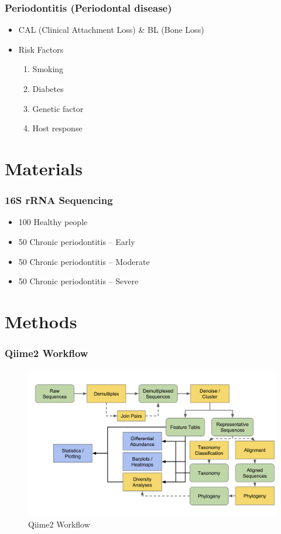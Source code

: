 \documentclass{beamer}
\begin{document}
    \begin{frame}
        \frametitle{Periodontitis (Periodontal disease)}

        \begin{itemize}
            \item CAL (Clinical Attachment Loss) \& BL (Bone Loss) \cite{periodontitis1}
            \item Risk Factors \cite{periodontitis2}
            \begin{enumerate}
                \item Smoking
                \item Diabetes
                \item Genetic factor
                \item Host response
            \end{enumerate}
        \end{itemize}
    \end{frame}

    \section{Materials}
    \begin{frame}
        \frametitle{16S rRNA Sequencing}

        \begin{itemize}
            \item 100 Healthy people
            \item 50 Chronic periodontitis -- Early
            \item 50 Chronic periodontitis -- Moderate
            \item 50 Chronic periodontitis -- Severe
        \end{itemize}
    \end{frame}

    \section{Methods}
    \begin{frame}
        \frametitle{Qiime2 Workflow}

        \begin{figure}
            \centering
            \includegraphics[width=0.7 \linewidth]{figures/qiime.png}
            \caption{Qiime2 Workflow \protected \cite{qiime1, qiime2}}
            \label{fig:qiime}
        \end{figure}
    \end{frame}
\end{document}
